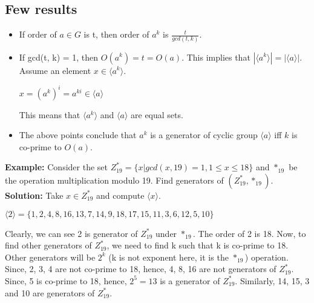 \documentclass[11pt]{article}
\begin{document}
\subsection{Few results}
\begin{itemize}
    \item If order of $a \in G$ is t, then order of $a^k$ is $\frac{t}{gcd(t, k)}$.
    \item If gcd(t, k) = 1, then $O(a^k) = t = O(a)$. This implies that $|\langle a^k \rangle| = |\langle a \rangle|$. Assume an element $x \in \langle a^k \rangle$.
    \begin{center}
        $x = (a^k)^i = a^{ki} \in \langle a \rangle$
    \end{center}
    This means that $\langle a^k \rangle$ and $\langle a \rangle$ are equal sets.

    \item The above points conclude that $a^k$ is a generator of cyclic group $\langle a \rangle$ iff $k$ is co-prime to $O(a)$.
\end{itemize}

\textbf{Example:} Consider the set $Z_{19}^* = \{x | gcd(x,19) = 1, 1 \leq x \leq 18\}$ and $*_{19}$ be the operation multiplication modulo 19. Find generators of $(Z_{19}^*, *_{19})$.\\
\textbf{Solution:} Take $x \in Z_{19}^*$ and compute $\langle x \rangle$.
\begin{center}
    $\langle 2 \rangle = \{1,2,4,8,16,13,7,14,9,18,17,15,11,3,6,12,5,10\}$
\end{center}
Clearly, we can see 2 is generator of $Z_{19}^*$ under $*_{19}$. The order of 2 is 18. Now, to find other generators of $Z_{19}^*$, we need to find k such that k is co-prime to 18. Other generators will be $2^k$ (k is not exponent here, it is the $*_{19}$) operation. Since, 2, 3, 4 are not co-prime to 18, hence, 4, 8, 16 are not generators of $Z_{19}^*$. Since, 5 is co-prime to 18, hence, $2^5 = 13$ is a generator of $Z_{19}^*$. Similarly, 14, 15, 3 and 10 are generators of $Z_{19}^*$.
\end{document}
